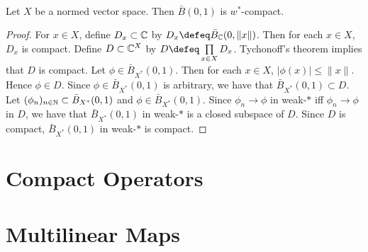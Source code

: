 \documentclass{book}
\begin{document}
	
	
	\begin{ex}  \\
		Let $X$ be a normed vector space. Then $\bar{B}(0,1)$ is $w^*$-compact. 
	\end{ex}

	\begin{proof}
		For $x \in X$, define $D_x \subset \mathbb{C}$ by $D_x \defeq \bar{B}_{\C}(0, \|x\|)$. Then for each $x \in X$, $D_x$ is compact. Define $D \subset \mathbb{C}^X$ by $D \defeq \prod\limits_{x \in X} D_x$. Tychonoff's theorem implies that $D$ is compact. Let $\phi \in \bar{B}_{X^*}(0,1)$. Then for each $x \in X$, $|\phi(x)| \leq \|x\|$. Hence $\phi \in D$. Since $\phi \in \bar{B}_{X^*}(0,1)$ is arbitrary, we have that $\bar{B}_{X^*}(0,1) \subset D$. Let $(\phi_n)_{n \in \mathbb{N}} \subset \bar{B}_{X^*}(0,1)$ and $\phi \in \bar{B}_{X^*}(0,1)$. Since $\phi_n \rightarrow \phi$ in weak-$*$ iff $\phi_n \rightarrow \phi$ in $D$, we have that $\bar{B}_{X^*}(0,1)$ in weak-$*$ is a closed subspace of $D$. Since $D$ is compact, $\bar{B}_{X^*}(0,1)$ in weak-$*$ is compact. 
		
 	\end{proof}







	
	
	
	






\newpage
\section{Compact Operators}


\begin{defn}

\end{defn}























	\newpage
	\section{Multilinear Maps}	
	
\end{document}
